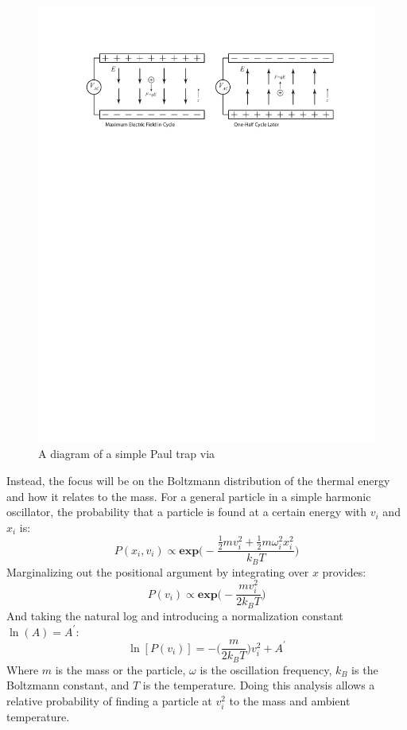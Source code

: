 \documentclass[12pt]{article}
\begin{document}
\begin{figure}[ht]
\centering
    \includegraphics[width=\textwidth]{paul_trap_diagram.pdf}
	\caption{A diagram of a simple Paul trap via \cite{libbrecht_black_2018}}
    \label{fig:paul_trap_diagram}
\end{figure}

Instead, the focus will be on the Boltzmann distribution of the thermal energy and how it relates to the mass. For a general particle in a simple harmonic oscillator, the probability that a particle is found at a certain energy with $v_i$ and $x_i$ is:
\begin{equation*}
P(x_i, v_i) \propto \textbf{exp}\Big(-\frac{\frac{1}{2}mv_i^2 + \frac{1}{2}m\omega_i^2x_i^2}{k_B T}\Big)
\label{eq:gen_prob}
\end{equation*}
Marginalizing out the positional argument by integrating over $x$ provides:
\begin{equation*}
P(v_i) \propto \textbf{exp} \Big( -\frac{mv_i^2}{2 k_B T}\Big)
\label{eq:marg_prob}
\end{equation*}
And taking the natural log and introducing a normalization constant $\ln(A) = A^\prime$:
\begin{equation}
\ln[P(v_i)] = -\Big(\frac{m}{2k_B T}\Big) v_i^2 + A^\prime
\label{eq:marg_prob2}
\end{equation}
Where $m$ is the mass or the particle, $\omega$ is the oscillation frequency, $k_B$ is the Boltzmann constant, and $T$ is the temperature. Doing this analysis allows a relative probability of finding a particle at $v_i^2$ to the mass and ambient temperature. 
\end{document}
